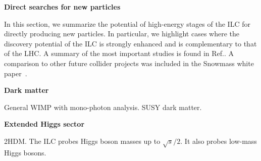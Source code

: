 {\bf Direct searches for new particles}

In this section, we summarize the potential of high-energy stages of the ILC for directly producing
new particles. In particular, we highlight cases where the discovery potential of the ILC is strongly enhanced and
is complementary to that of the LHC. A summary of the most important studies is found in Ref.\cite{Fujii:2017ekh}.
A comparison to other future collider projects was included in the Snowmass white paper~\cite{Baer:2013vqa}. 

{\bf Dark matter}

General WIMP with mono-photon analysis. SUSY dark matter.

{\bf Extended Higgs sector}

2HDM.
The ILC probes Higgs boson masses up to $\sqrt{s}/2$. It also probes low-mass Higgs bosons.